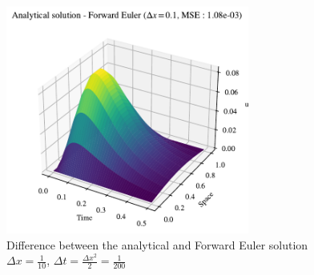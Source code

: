 \documentclass{article}
\theoremstyle{definition}
\begin{document}
\begin{figure}[H]%
    \centering
    \includegraphics[width=8cm]{Project3/figures/1dHeat/dx=0.1.pdf}
    \caption{Difference between the analytical and Forward Euler solution $\Delta x = \frac{1}{10}$, $\Delta t = \frac{\Delta x^2}{2} = \frac{1}{200} $}
    \label{fig:ForwardEulerdx=0.1}
\end{figure}
\end{document}
